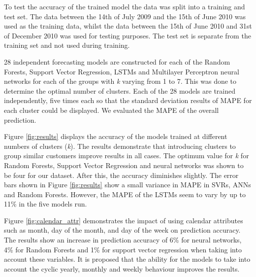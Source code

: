 To test the accuracy of the trained model the data was split into a training and test set. The data between the 14th of July 2009 and the 15th of June 2010 was used as the training data, whilst the data between the 15th of June 2010 and 31st of December 2010 was used for testing purposes. The test set is separate from the training set and not used during training. 

28 independent forecasting models are constructed for each of the Random Forests, Support Vector Regression, LSTMs and Multilayer Perceptron neural networks for each of the groups with \textit{k} varying from 1 to 7. This was done to determine the optimal number of clusters.  Each of the 28 models are trained independently, five times each so that the standard deviation results of MAPE for each cluster could be displayed. We evaluated the MAPE of the overall prediction. 

Figure \ref{fig:results} displays the accuracy of the models trained at different numbers of clusters (\textit{k}). The results demonstrate that introducing clusters to group similar customers improve results in all cases. The optimum value for \textit{k} for Random Forests, Support Vector Regression and neural networks was shown to be four for our dataset. After this, the accuracy diminishes slightly. The error bars shown in Figure \ref{fig:results} show a small variance in MAPE in SVRs, ANNs and Random Forests. However, the MAPE of the LSTMs seem to vary by up to 11\% in the five models run. 

Figure \ref{fig:calendar_attr} demonstrates the impact of using calendar attributes such as month, day of the month, and day of the week on prediction accuracy. The results show an increase in prediction accuracy of 6\% for neural networks, 4\% for Random Forests and 1\% for support vector regression when taking into account these variables. It is proposed that the ability for the models to take into account the cyclic yearly, monthly and weekly behaviour improves the results.


